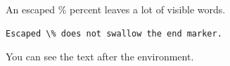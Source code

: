 
An escaped \% percent leaves a lot of visible words.
\begin{verbatim}
Escaped \% does not swallow the end marker.
\end{verbatim}
You can see the text after the environment.

